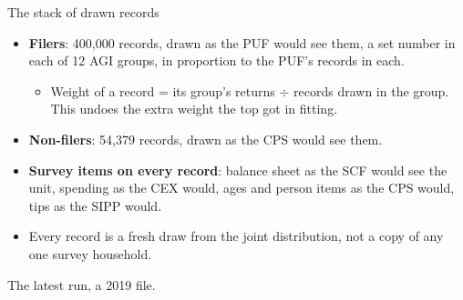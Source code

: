 \documentclass[11pt,aspectratio=169]{beamer}
\newcommand{\slidenote}[1]{\par\vfill{\scriptsize\color{yalegrey}#1}}
\begin{document}
\begin{frame}{The stack of drawn records}
  \begin{itemize}
    \item \textbf{Filers}: 400,000 records, drawn as the PUF would see them, a set number
          in each of 12 AGI groups, in proportion to the PUF's records in each.
    \begin{itemize}\small
      \item Weight of a record = its group's returns $\div$ records drawn in the group.
            This undoes the extra weight the top got in fitting.
    \end{itemize}
    \vspace{0.4em}
    \item \textbf{Non-filers}: 54,379 records, drawn as the CPS would see them.
    \vspace{0.4em}
    \item \textbf{Survey items on every record}: balance sheet as the SCF would see the unit,
          spending as the CEX would, ages and person items as the CPS would, tips as the SIPP would.
    \vspace{0.4em}
    \item Every record is a fresh draw from the joint distribution, not a copy of any one
          survey household.
  \end{itemize}
  \slidenote{The latest run, a 2019 file.}
\end{frame}
\end{document}
